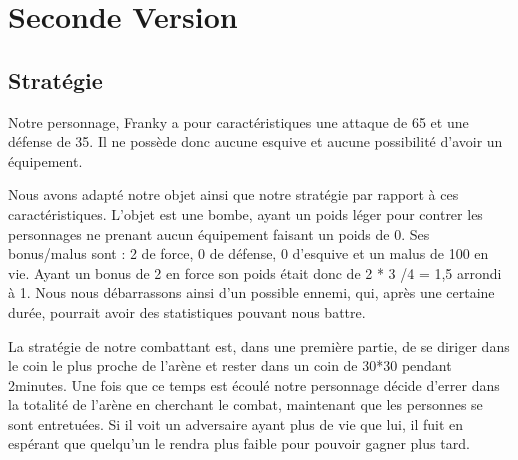 \documentclass[12pt,a4paper,openany]{book}
\let\pagebreakORIG\pagebreak
\let\clearpageORIG\clearpage
\let\cleardoublepageORIG\cleardoublepage
\newcommand{\removepagebreak}{\renewcommand{\pagebreak}{}\renewcommand{\clearpage}{}\renewcommand{\cleardoublepage}{}}
\newcommand{\restorepagebreak}{\renewcommand{\pagebreak}{\pagebreakORIG}\renewcommand{\clearpage}{\clearpageORIG}\renewcommand{\cleardoublepage}{\cleardoublepageORIG}}
\begin{document}
	\chapter{Seconde Version}
	\section{Stratégie}
Notre personnage, Franky a pour caractéristiques une attaque de 65 et une défense de 35. Il ne possède donc aucune esquive et aucune possibilité d’avoir un
équipement. 

Nous avons adapté notre objet ainsi que notre stratégie par rapport à ces caractéristiques. L'objet est une bombe, ayant un poids léger pour
contrer les personnages ne prenant aucun équipement faisant un poids de 0. Ses bonus/malus sont : 2 de force, 0 de défense, 0 d'esquive et un malus de 100 en vie. Ayant un bonus de 2 en force son poids était donc de 2 * 3 /4 = 1,5 arrondi à 1. Nous nous débarrassons ainsi d’un possible ennemi, qui, après une certaine
durée, pourrait avoir des statistiques pouvant nous battre. 

La stratégie de notre combattant est, dans une première partie, de se diriger dans le coin le plus
proche de l'arène et rester dans un coin de 30*30 pendant 2minutes. Une fois que ce temps est écoulé notre personnage décide d'errer dans la totalité de
l'arène en cherchant le combat, maintenant que les personnes se sont entretuées. Si il voit un adversaire ayant plus de vie que lui, il fuit en espérant que
quelqu'un le rendra plus faible pour pouvoir gagner plus tard.

\appendix
\listoffigures
\removepagebreak
	\vfill
\listoftables
	\vfill
	\restorepagebreak
\end{document}
